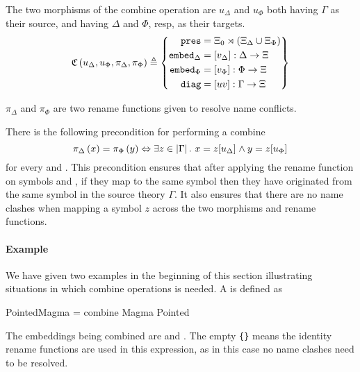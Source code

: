 The two morphisms of the combine operation are $u_{\Delta}$ and $u_{\Phi}$ both having $\Gamma$ as their source, and having $\Delta$ and $\Phi$, resp, as their targets. 
\[
\mathfrak{C}\left( u_{\Delta}, u_{\Phi}, \pi_{\Delta}, \pi_{\Phi}\right) \triangleq
\left\{\begin{aligned}
\mathtt{pres} & = \Xi_0\rtimes\left(\Xi_{\Delta} \cup \Xi_{\Phi}\right) \\
\mathtt{embed}_{\Delta} & = \left[v_{\Delta}\right] : \Delta\rightarrow\Xi\\
\mathtt{embed}_{\Phi} & = \left[v_{\Phi}\right] : \Phi\rightarrow\Xi\\
\mathtt{diag} & = \left[uv\right]:\Gamma\rightarrow\Xi\\
\end{aligned}\right\}\]
 
$\pi_{\Delta}$ and $\pi_{\Phi}$ are two rename functions given to resolve name conflicts. 

There is the following precondition for performing a combine 
\begin{equation}
\pi_{\Delta} \left( x \right) = \pi_{\Phi} \left( y \right)
\Leftrightarrow \exists z \in \left| \Gamma \right|.\ x =
z[ u_{\Delta}]_{} \wedge y = z[ u_{\Phi}]_{} 
\label{eq:combinePrecond}
\end{equation}
for every  and . 
This precondition ensures that after applying the rename function on symbols  and , if they map to the same symbol then they have originated from the same symbol in the source theory $\Gamma$. It also ensures that there are no name clashes when mapping a symbol $z$ across the two morphisms and rename functions.  

\paragraph{Example}
We have given two examples in the beginning of this section illustrating situations in which combine operations is needed. A  is defined as 
\begin{togcode} 
PointedMagma = combine Magma {} Pointed {} 
\end{togcode} 
The embeddings being combined are  and . The empty 
\lstinline|{}| means the identity rename functions are used in this expression, as in this case no name clashes need to be resolved. 

